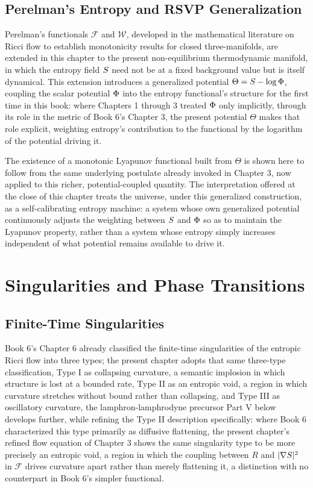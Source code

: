 \chapter{Perelman's Entropy and RSVP Generalization}

Perelman's functionals $\mathcal{F}$ and $\mathcal{W}$, developed in the mathematical literature on Ricci flow to establish monotonicity results for closed three-manifolds, are extended in this chapter to the present non-equilibrium thermodynamic manifold, in which the entropy field $S$ need not be at a fixed background value but is itself dynamical. This extension introduces a generalized potential $\Theta = S - \log \Phi$, coupling the scalar potential $\Phi$ into the entropy functional's structure for the first time in this book: where Chapters 1 through 3 treated $\Phi$ only implicitly, through its role in the metric of Book 6's Chapter 3, the present potential $\Theta$ makes that role explicit, weighting entropy's contribution to the functional by the logarithm of the potential driving it.

The existence of a monotonic Lyapunov functional built from $\Theta$ is shown here to follow from the same underlying postulate already invoked in Chapter 3, now applied to this richer, potential-coupled quantity. The interpretation offered at the close of this chapter treats the universe, under this generalized construction, as a self-calibrating entropy machine: a system whose own generalized potential continuously adjusts the weighting between $S$ and $\Phi$ so as to maintain the Lyapunov property, rather than a system whose entropy simply increases independent of what potential remains available to drive it.

\part{Singularities and Phase Transitions}

\chapter{Finite-Time Singularities}

Book 6's Chapter 6 already classified the finite-time singularities of the entropic Ricci flow into three types; the present chapter adopts that same three-type classification, Type I as collapsing curvature, a semantic implosion in which structure is lost at a bounded rate, Type II as an entropic void, a region in which curvature stretches without bound rather than collapsing, and Type III as oscillatory curvature, the lamphron-lamphrodyne precursor Part V below develops further, while refining the Type II description specifically: where Book 6 characterized this type primarily as diffusive flattening, the present chapter's refined flow equation of Chapter 3 shows the same singularity type to be more precisely an entropic void, a region in which the coupling between $R$ and $|\nabla S|^2$ in $\mathcal{F}$ drives curvature apart rather than merely flattening it, a distinction with no counterpart in Book 6's simpler functional.

